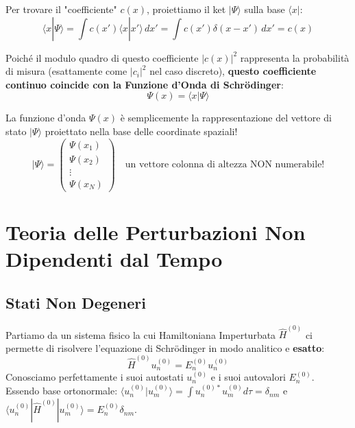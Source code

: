\documentclass[11pt, a4paper]{article}
\begin{document}
\noindent
Per trovare il "coefficiente" $c(x)$, proiettiamo il ket $|\Psi\rangle$ sulla base $\langle x|$: %
\begin{equation*}
    \langle x | \Psi \rangle = \int c(x') \langle x | x' \rangle \, dx' = \int c(x') \delta(x-x') \, dx' = c(x) %
\end{equation*}

\noindent
Poiché il modulo quadro di questo coefficiente $|c(x)|^2$ rappresenta la probabilità di misura (esattamente come $|c_i|^2$ nel caso discreto), \textbf{questo coefficiente continuo coincide con la Funzione d'Onda di Schrödinger}: %
\begin{equation}
    \boxed{ \Psi(x) = \langle x | \Psi \rangle } %
\end{equation}

\noindent
La funzione d'onda $\Psi(x)$ è semplicemente la rappresentazione del vettore di stato $|\Psi\rangle$ proiettato nella base delle coordinate spaziali! %
\begin{equation*}
    |\Psi\rangle = \begin{pmatrix} \Psi(x_1) \\ \Psi(x_2) \\ \vdots \\ \Psi(x_N) \end{pmatrix} \quad \text{un vettore colonna di altezza NON numerabile!} %
\end{equation*}

\section{Teoria delle Perturbazioni Non Dipendenti dal Tempo} %
\subsection{Stati Non Degeneri} %

Partiamo da un sistema fisico la cui Hamiltoniana Imperturbata $\hat{H}^{(0)}$ ci permette di risolvere l'equazione di Schrödinger in modo analitico e \textbf{esatto}: %
\begin{equation*}
    \hat{H}^{(0)} u_n^{(0)} = E_n^{(0)} u_n^{(0)} %
\end{equation*}
Conosciamo perfettamente i suoi autostati $u_n^{(0)}$ e i suoi autovalori $E_n^{(0)}$. %
Essendo base ortonormale: $\langle u_n^{(0)} | u_m^{(0)} \rangle = \int u_n^{(0)*} u_m^{(0)} d\tau = \delta_{nm}$ e $\langle u_n^{(0)} | \hat{H}^{(0)} | u_m^{(0)} \rangle = E_n^{(0)} \delta_{nm}$. \\
\end{document}
